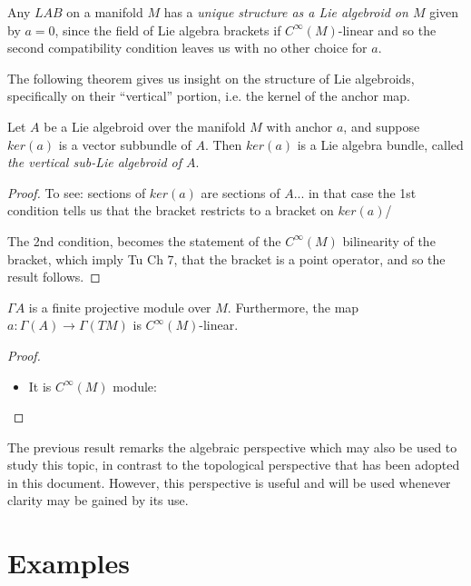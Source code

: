 Any $LAB$ on a manifold $M$ has a \emph{unique structure as a Lie algebroid on $M$} given by $a = 0$, since the field of Lie algebra brackets if $C^\infty(M)$-linear and so the second compatibility condition leaves us with no other choice for $a$.

The following theorem gives us insight on the structure of Lie algebroids, specifically on their ``vertical'' portion, i.e. the kernel of the anchor map.

\begin{theorem} \label{theoFiberLie}
Let $A$ be a Lie algebroid over the manifold $M$ with anchor $a$, and suppose $ker(a)$ is a vector subbundle of $A$. Then $ker(a)$ %
is a Lie algebra bundle, called \emph{the vertical sub-Lie algebroid of $A$}.
\end{theorem}

\begin{proof}
To see: sections of $ker(a)$ are sections of $A$... in that case the 1st condition tells us that the bracket restricts to a bracket on $ker(a)$/

The 2nd condition, becomes the statement of the $C^\infty(M)$ bilinearity of the bracket, which imply Tu Ch 7, that the bracket is a point operator, and so the result follows.
\end{proof}

\begin{proposition}
$\Gamma A$ is a finite projective module over $M$. Furthermore, the map $a: \Gamma(A) \to \Gamma(TM)$ is $C^\infty(M)$-linear.
\end{proposition}
\begin{proof}
    \begin{itemize}
    \item It is $C^\infty(M)$ module:
    \end{itemize}
\end{proof}

The previous result remarks the algebraic perspective which may also be used to study this topic, in contrast to the topological perspective that has been adopted in this document. However, this perspective is useful and will be used whenever clarity may be gained by its use.

\section{Examples}

